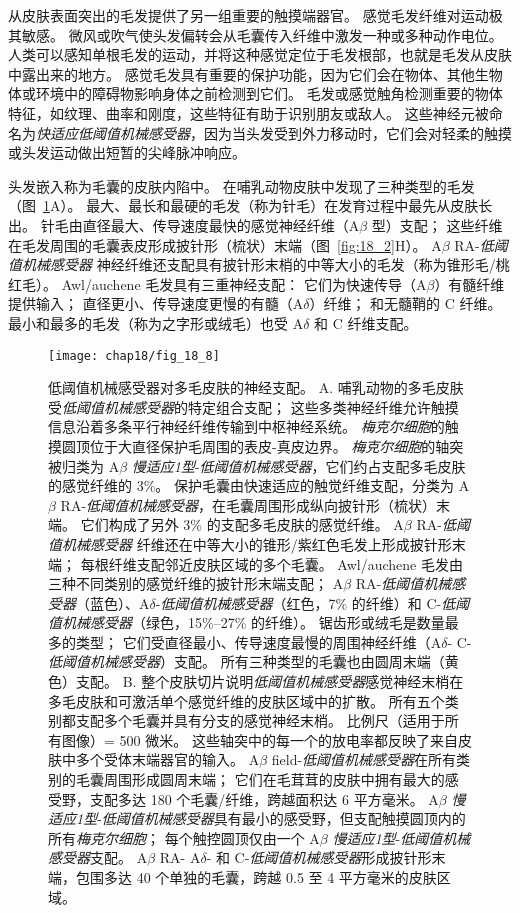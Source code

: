 从皮肤表面突出的毛发提供了另一组重要的触摸端器官。 
感觉毛发纤维对运动极其敏感。
微风或吹气使头发偏转会从毛囊传入纤维中激发一种或多种动作电位。
人类可以感知单根毛发的运动，并将这种感觉定位于毛发根部，也就是毛发从皮肤中露出来的地方。
感觉毛发具有重要的保护功能，因为它们会在物体、其他生物体或环境中的障碍物影响身体之前检测到它们。
毛发或感觉触角检测重要的物体特征，如纹理、曲率和刚度，这些特征有助于识别朋友或敌人。
这些神经元被命名为\textit{快适应低阈值机械感受器}，因为当头发受到外力移动时，它们会对轻柔的触摸或头发运动做出短暂的尖峰脉冲响应。


头发嵌入称为毛囊的皮肤内陷中。
在哺乳动物皮肤中发现了三种类型的毛发（图~\ref{fig:18_8}A）。
最大、最长和最硬的毛发（称为针毛）在发育过程中最先从皮肤长出。
针毛由直径最大、传导速度最快的感觉神经纤维（A$\beta$ 型）支配；
这些纤维在毛发周围的毛囊表皮形成披针形（梳状）末端（图~\ref{fig:18_2}H）。
A$\beta$ RA-\textit{低阈值机械感受器} 神经纤维还支配具有披针形末梢的中等大小的毛发（称为锥形毛/桃红毛）。
Awl/auchene 毛发具有三重神经支配：
它们为快速传导（A$\beta$）有髓纤维提供输入；
直径更小、传导速度更慢的有髓（A$\delta$）纤维；
和无髓鞘的 C 纤维。
最小和最多的毛发（称为之字形或绒毛）也受 A$\delta$ 和 C 纤维支配。


\begin{figure}[htbp]
	\centering
	\texttt{[image: chap18/fig\_18\_8]}
	\caption{低阈值机械感受器对多毛皮肤的神经支配。
		A. 哺乳动物的多毛皮肤受\textit{低阈值机械感受器}的特定组合支配；
		这些多类神经纤维允许触摸信息沿着多条平行神经纤维传输到中枢神经系统。
		\textit{梅克尔细胞}的触摸圆顶位于大直径保护毛周围的表皮-真皮边界。
		\textit{梅克尔细胞}的轴突被归类为 A$\beta$ \textit{慢适应1型}-\textit{低阈值机械感受器}，它们约占支配多毛皮肤的感觉纤维的 3\%。
		保护毛囊由快速适应的触觉纤维支配，分类为 A$\beta$ RA-\textit{低阈值机械感受器}，在毛囊周围形成纵向披针形（梳状）末端。
		它们构成了另外 3\% 的支配多毛皮肤的感觉纤维。
		A$\beta$ RA-\textit{低阈值机械感受器} 纤维还在中等大小的锥形/紫红色毛发上形成披针形末端； 每根纤维支配邻近皮肤区域的多个毛囊。
		Awl/auchene 毛发由三种不同类别的感觉纤维的披针形末端支配； A$\beta$ RA-\textit{低阈值机械感受器}（蓝色）、A$\delta$-\textit{低阈值机械感受器}（红色，7\% 的纤维）和 C-\textit{低阈值机械感受器}（绿色，15\%–27\% 的纤维）。
		锯齿形或绒毛是数量最多的类型；
		它们受直径最小、传导速度最慢的周围神经纤维（A$\delta$- C-\textit{低阈值机械感受器}）支配。 
		所有三种类型的毛囊也由圆周末端（黄色）支配\cite{zimmerman2014gentle}。
		B. 整个皮肤切片说明\textit{低阈值机械感受器}感觉神经末梢在多毛皮肤和可激活单个感觉纤维的皮肤区域中的扩散。
		所有五个类别都支配多个毛囊并具有分支的感觉神经末梢。
		比例尺（适用于所有图像）= 500 微米。 
		这些轴突中的每一个的放电率都反映了来自皮肤中多个受体末端器官的输入。
		A$\beta$ field-\textit{低阈值机械感受器}在所有类别的毛囊周围形成圆周末端；
		它们在毛茸茸的皮肤中拥有最大的感受野，支配多达 180 个毛囊/纤维，跨越面积达 6 平方毫米。
		A$\beta$ \textit{慢适应1型}-\textit{低阈值机械感受器}具有最小的感受野，但支配触摸圆顶内的所有\textit{梅克尔细胞}；
		每个触控圆顶仅由一个 A$\beta$ \textit{慢适应1型}-\textit{低阈值机械感受器}支配。
		A$\beta$ RA- A$\delta$- 和 C-\textit{低阈值机械感受器}形成披针形末端，包围多达 40 个单独的毛囊，跨越 0.5 至 4 平方毫米的皮肤区域\cite{bai2015genetic}。}
	\label{fig:18_8}
\end{figure}


